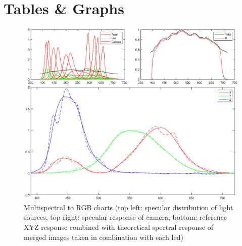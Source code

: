 \documentclass[11pt, twoside, listof=totocnumbered, bibliography=totocnumbered]{scrartcl}
\begin{document}
\section{Tables \& Graphs}
\begin{figure}[h!]
	\begin{center} 
		\includegraphics[width=1\linewidth]{chart.eps}
		\caption{Multispectral to RGB charts (top left: specular distribution of light sources, top right: specular response of camera, bottom: reference XYZ response combined with theoretical spectral response of merged images taken in combination with each led)} 
		\label{Figure 1}
	\end{center} 
\end{figure} 

\newpage

\end{document}
